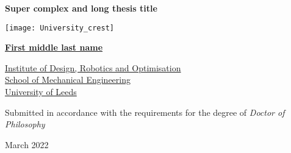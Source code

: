 \begin{titlepage}
	\begin{center}
		
		
		\vspace{1cm}
		
		{\LARGE \textbf{Super complex and long thesis title}}
		
		\vspace{0.5cm}
		
		\vspace{1.5cm}
		
		\texttt{[image: University\_crest]}
		
		\vspace{1.5cm}
		
		{\Large\href{mailto:email@gmail.com}{\textbf{First middle last name}}}
		
		\vspace{1.5cm}
		
		\href{https://eps.leeds.ac.uk/mechanical-engineering-research-design-robotics-optimisation}{Institute of Design, Robotics and Optimisation} \\
		\href{https://eps.leeds.ac.uk/mechanical-engineering}{School of Mechanical Engineering} \\
		\href{http://www.leeds.ac.uk}{University of Leeds}
		
		\vspace{3.5cm}
		
		
		Submitted in accordance with the requirements for the degree of
		\textit{Doctor of Philosophy} 
		
		March 2022
		
	\end{center}
\end{titlepage}